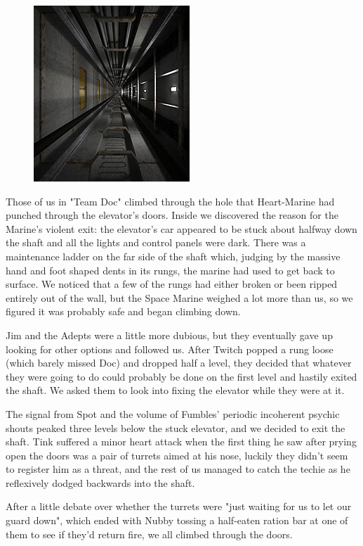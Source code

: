 \begin{figure}
	\begin{center}
		\includegraphics[width=\figwidth]{pics/16/20.png}
	\end{center}
\end{figure}
Those of us in "Team Doc" climbed through the hole that Heart-Marine had punched through the elevator's doors. 
Inside we discovered the reason for the Marine's violent exit: 
the elevator's car appeared to be stuck about halfway down the shaft and all the lights and control panels were dark. 
There was a maintenance ladder on the far side of the shaft which, judging by the massive hand and foot shaped dents in its rungs, the marine had used to get back to surface. 
We noticed that a few of the rungs had either broken or been ripped entirely out of the wall, but the Space Marine weighed a lot more than us, so we figured it was probably safe and began climbing down. 


Jim and the Adepts were a little more dubious, but they eventually gave up looking for other options and  followed us. 
After Twitch popped a rung loose (which barely missed Doc) and dropped half a level, they decided that whatever they were going to do could probably be done on the first level and hastily exited the shaft. 
We asked them to look into fixing the elevator while they were at it.

The signal from Spot and the volume of Fumbles' periodic incoherent psychic shouts peaked three levels below the stuck elevator, and we decided to exit the shaft. 
Tink suffered a minor heart attack when the first thing he saw after prying open the doors was a pair of turrets aimed at his nose, luckily they didn't seem to register him as a threat, and the rest of us managed to catch the techie as he reflexively dodged backwards into the shaft. 


After a little debate over whether the turrets were "just waiting for us to let our guard down", which ended with Nubby tossing a half-eaten ration bar at one of them to see if they'd return fire, we all climbed through the doors. 


